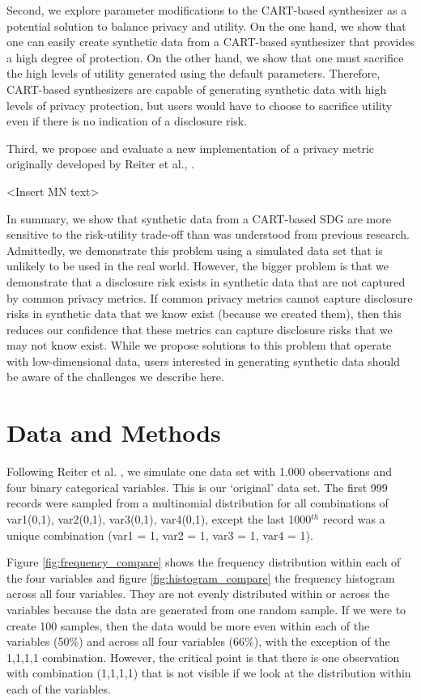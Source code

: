 \documentclass[runningheads]{llncs}
\begin{document}
Second, we explore parameter modifications to the CART-based synthesizer as a potential solution to balance privacy and utility.  On the one hand, we show that one can easily create synthetic data from a CART-based synthesizer that provides a high degree of protection.  On the other hand, we show that one must sacrifice the high levels of utility generated using the default parameters.  Therefore, CART-based synthesizers are capable of generating synthetic data with high levels of privacy protection, but users would have to choose to sacrifice utility even if there is no indication of a disclosure risk.

Third, we propose and evaluate a new implementation of a privacy metric originally developed by Reiter et al., \cite{reiter2014bayesian}. 

<Insert MN text>

In summary, we show that synthetic data from a CART-based SDG are more sensitive to the risk-utility trade-off than was understood from previous research.  Admittedly, we demonstrate this problem using a simulated data set that is unlikely to be used in the real world.  However, the bigger problem is that we demonstrate that a disclosure risk exists in synthetic data that are not captured by common privacy metrics.  If common privacy metrics cannot capture disclosure risks in synthetic data that we know exist (because we created them), then this reduces our confidence that these metrics can capture disclosure risks that we may not know exist.  While we propose solutions to this problem that operate with low-dimensional data, users interested in generating synthetic data should be aware of the challenges we describe here.

\section{Data and Methods}

Following Reiter et al. \cite{reiter2014bayesian}, we simulate one data set with 1.000 observations and four binary categorical variables.  This is our `original' data set.  The first 999 records were sampled from a multinomial distribution for all combinations of var1(0,1), var2(0,1), var3(0,1), var4(0,1), except the last 1000$^{th}$ record was a unique combination (var1 = 1, var2 = 1, var3 = 1, var4 = 1).  

Figure \ref{fig:frequency_compare} shows the frequency distribution within each of the four variables and figure \ref{fig:histogram_compare} the frequency histogram across all four variables.  They are not evenly distributed within or across the variables because the data are generated from one random sample.  If we were to create 100 samples, then the data would be more even within each of the variables (50\%) and across all four variables (66\%), with the exception of the 1,1,1,1 combination.  However, the critical point is that there is one observation with combination (1,1,1,1) that is not visible if we look at the distribution within each of the variables.
\end{document}
